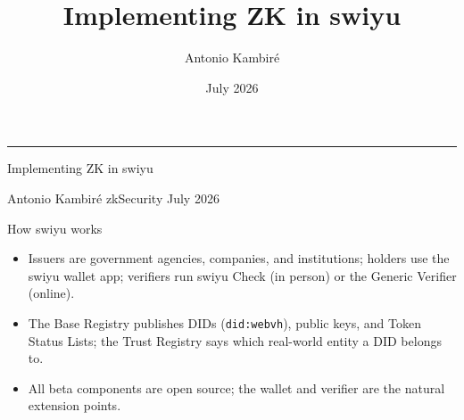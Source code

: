 \documentclass[aspectratio=169]{beamer}
\title{Implementing ZK in swiyu}
\author{Antonio Kambir\'e}
\institute{zkSecurity}
\date{July 2026}
\newcommand{\sourcefoot}{}
\newcommand{\setsources}[1]{\renewcommand{\sourcefoot}{#1}}
\begin{document}
\setsources{}
\begin{frame}[plain]
  \vspace{2.1cm}
  {\color{zkblue}\rule{0.15\paperwidth}{1.1pt}}\par
  \vspace{0.42cm}
  {\LARGE\bfseries\raggedright Implementing ZK in swiyu\par}
  \vspace{0.32cm}
  {\large\color{zkmuted}\raggedright
    Antonio Kambir\'e \quad \textbar \quad zkSecurity \quad \textbar \quad July 2026\par}
\end{frame}

\setsources{\href{https://swiyu-admin-ch.github.io/introduction/}{swiyu Introduction}; \href{https://swiyu-admin-ch.github.io/technology-stack/}{Technology Stack}; \href{https://swiyu-admin-ch.github.io/open-source-components/}{Open Source Components}}
\begin{frame}{How swiyu works}
  \begin{minipage}{0.94\linewidth}
    \begin{itemize}
      \item Issuers are government agencies, companies, and institutions; holders
        use the swiyu wallet app; verifiers run swiyu Check (in person) or the
        Generic Verifier (online).
      \item The Base Registry publishes DIDs (\texttt{did:webvh}), public keys,
        and Token Status Lists; the Trust Registry says which real-world entity
        a DID belongs to.
      \item All beta components are open source; the wallet and verifier are the
        natural extension points.
    \end{itemize}
  \end{minipage}

  \vspace{0.85em}
  \centering
\end{frame}
\end{document}
